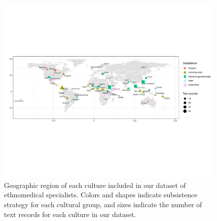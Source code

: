 \documentclass[
  11pt,
]{article}
\begin{document}
\begin{landscape}

\begin{figure}[p]

{\centering \includegraphics{magic-healers-article2_files/figure-latex/worldmap-1} 

}

\caption{Geographic region of each culture included in our dataset of ethnomedical specialists. Colors and shapes indicate subsistence strategy for each cultural group, and sizes indicate the number of text records for each culture in our dataset.}\label{fig:worldmap}
\end{figure}

\end{landscape}
\end{document}
